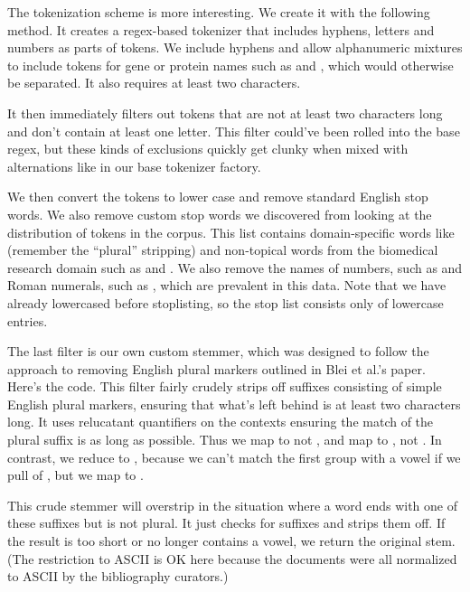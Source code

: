 The tokenization scheme is more interesting.  We create it with
the following method.
%
%
It creates a regex-based tokenizer that includes hyphens, letters and
numbers as parts of tokens.  We include hyphens and allow alphanumeric
mixtures to include tokens for gene or protein names such as
 and , which would otherwise be
separated.  It also requires at least two characters.

It then immediately filters out tokens that are not at least two
characters long and don't contain at least one letter.  This filter
could've been rolled into the base regex, but these kinds of
exclusions quickly get clunky when mixed with alternations like in
our base tokenizer factory.  

We then convert the tokens to lower case and remove standard English
stop words.  We also remove custom stop words we discovered from
looking at the distribution of tokens in the corpus.  This list
contains domain-specific words like  (remember
the ``plural'' stripping) and non-topical words from the biomedical
research domain such as  and
.  We also remove the names of numbers, such
as  and Roman numerals, such as ,
which are prevalent in this data.  Note that we have already lowercased
before stoplisting, so the stop list consists only of lowercase
entries.

The last filter is our own custom stemmer, which was designed to
follow the approach to removing English plural markers outlined in
Blei et al.'s paper.  Here's the code.
%
%
This filter fairly crudely strips off suffixes consisting of simple
English plural markers, ensuring that what's left behind is at least
two characters long.  It uses relucatant quantifiers on the contexts
ensuring the match of the plural suffix is as long as possible.  Thus
we map  to  not
, and map  to
, not .  In contrast, we
reduce  to , because we can't
match the first group with a vowel if we pull of ,
but we map  to .  

This crude stemmer will overstrip in the situation where a word ends
with one of these suffixes but is not plural.  It just checks for
suffixes and strips them off.  If the result is too short or no longer
contains a vowel, we return the original stem.  (The restriction to
ASCII is OK here because the documents were all normalized to ASCII by
the bibliography curators.)



